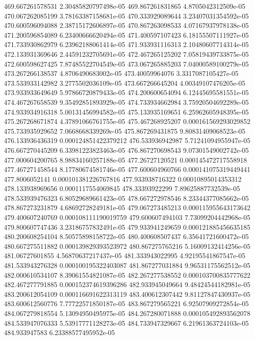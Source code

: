{469.667261578531 2.30485820797498e-05
469.867261831865 4.8705042312509e-05
470.067262085199 3.78163387158681e-05
470.333929089644 3.23407031354592e-05
470.600596094088 2.38715172606897e-05
470.867263098533 4.07167937978138e-05
471.200596854089 6.23400666620494e-05
471.400597107423 6.18155507111927e-05
471.733930862979 6.23962188061414e-05
471.933931116313 2.10480607714314e-05
472.133931369646 2.44591232705691e-05
472.467265125202 7.05819439733875e-05
472.600598627425 7.87485522704549e-05
473.067265885203 7.04000589100279e-05
473.267266138537 4.8706490683002e-05
473.40059964076 3.3317087105427e-05
473.533933142982 3.2775502036109e-05
473.667266645204 4.00349107476205e-05
473.933933649649 5.97866720879433e-05
474.200600654094 6.12445695581551e-05
474.467267658539 9.35492851893929e-05
474.733934662984 3.75920504692289e-05
474.933934916318 5.00131456994582e-05
475.133935169651 6.25962605948395e-05
475.267268671874 4.37891066761755e-05
475.467268925207 0.000161569293029852
475.733935929652 7.0668668339269e-05
475.867269431875 9.80831409068523e-05
476.133936436319 0.000124851422379212
476.533936942987 5.71241094955947e-05
476.667270445209 6.33981223823463e-05
476.867270698543 9.07301549002742e-05
477.000604200765 8.98834160257188e-05
477.26727120521 0.000145472717558918
477.467271458544 8.17780674581746e-05
477.600604960766 0.000141075319449441
477.8006052141 0.000101381226767816
477.933938716322 0.00010895014353312
478.133938969656 0.0001117554069845
478.33393922299 7.89625887732539e-05
478.533939476323 6.80529689661423e-05
478.667272978546 8.23344377085662e-05
478.867273231879 4.68692728249181e-05
479.067273485213 0.000115955643173642
479.400607240769 0.000108111190019759
479.600607494103 7.73099204442968e-05
479.800607747436 3.23186757832491e-05
479.933941249659 0.000121885456635185
480.200608254104 8.50575898158722e-05
480.400608507437 6.35641721600472e-05
480.667275511882 0.000139829393523972
480.867275765216 5.16009132414256e-05
481.06727601855 4.56870637217437e-05
481.333943022995 4.92195541867547e-05
481.533943276328 0.000100195322403087
481.867277031884 9.96531175562512e-05
482.000610534107 8.39061554821087e-05
482.267277538552 0.000103700835777622
482.467277791885 0.000152374619396286
482.933945049664 9.48424544182981e-05
483.200612054109 0.000116691622313119
483.400612307442 9.81127847430937e-05
483.600612560776 7.77722571850187e-05
483.867279565221 6.92507909272854e-05
484.067279818554 5.13094950495975e-05
484.267280071888 0.000105492893562078
484.533947076333 5.53917771128273e-05
484.733947329667 6.21961363724103e-05
484.933947583 6.23388577495952e-05
}
